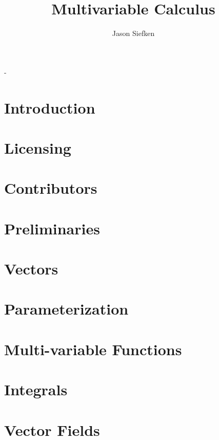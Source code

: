 \documentclass[letter, 11pt, onesided]{memoir}
\author{Jason Siefken}
\title{Multivariable Calculus}
\numberwithin{dummy}{section}
\theoremstyle{orangenumbox}
\theoremstyle{ocrenumbox}
\begin{document}
\frontmatter
\begin{titlingpage}
	\calccentering{\unitlength}
	\begin{adjustwidth*}{\unitlength}{-\unitlength}
		\maketitle
	\end{adjustwidth*}
\end{titlingpage}

\clearpage

\tableofcontents*
\clearpage

\chapter{Introduction}
	
\chapter{Licensing}
	
\chapter{Contributors}
	
\mainmatter

\chapter{Preliminaries}
	
	\clearpage
\chapter{Vectors}
	
	\clearpage
\chapter{Parameterization}
	
	\clearpage
\chapter{Multi-variable Functions}
	
	\clearpage
\chapter{Integrals}
	
	\clearpage
\chapter{Vector Fields}
	
	\clearpage
\end{document}
